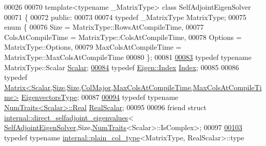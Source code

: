 \begin{DoxyCode}
00026 
00070 \textcolor{keyword}{template}<\textcolor{keyword}{typename} \_MatrixType> \textcolor{keyword}{class }SelfAdjointEigenSolver
00071 \{
00072   \textcolor{keyword}{public}:
00073 
00074     \textcolor{keyword}{typedef} \_MatrixType MatrixType;
00075     \textcolor{keyword}{enum} \{
00076       Size = MatrixType::RowsAtCompileTime,
00077       ColsAtCompileTime = MatrixType::ColsAtCompileTime,
00078       Options = MatrixType::Options,
00079       MaxColsAtCompileTime = MatrixType::MaxColsAtCompileTime
00080     \};
00081     
\hyperlink{group___eigenvalues___module_a0bfcedf4245b6846007ca4f01e4feb1f}{00083}     \textcolor{keyword}{typedef} \textcolor{keyword}{typename} MatrixType::Scalar \hyperlink{group___eigenvalues___module_a0bfcedf4245b6846007ca4f01e4feb1f}{Scalar};
\hyperlink{group___eigenvalues___module_a8a59ab7734b6eae2754fd78bc7c3a360}{00084}     \textcolor{keyword}{typedef} \hyperlink{namespace_eigen_a62e77e0933482dafde8fe197d9a2cfde}{Eigen::Index} \hyperlink{group___eigenvalues___module_a8a59ab7734b6eae2754fd78bc7c3a360}{Index}; 
00085     
00086     \textcolor{keyword}{typedef} 
      \hyperlink{group___core___module}{Matrix<Scalar,Size,Size,ColMajor,MaxColsAtCompileTime,MaxColsAtCompileTime>}
       \hyperlink{group___core___module}{EigenvectorsType};
00087 
\hyperlink{group___eigenvalues___module_a5dae5f422a3c71060e6bd31332bf64fd}{00094}     \textcolor{keyword}{typedef} \textcolor{keyword}{typename} \hyperlink{group___core___module_struct_eigen_1_1_num_traits}{NumTraits<Scalar>::Real} \hyperlink{group___eigenvalues___module_a5dae5f422a3c71060e6bd31332bf64fd}{RealScalar};
00095     
00096     \textcolor{keyword}{friend} \textcolor{keyword}{struct }\hyperlink{struct_eigen_1_1internal_1_1direct__selfadjoint__eigenvalues}{internal::direct\_selfadjoint\_eigenvalues}<
      \hyperlink{group___eigenvalues___module_class_eigen_1_1_self_adjoint_eigen_solver}{SelfAdjointEigenSolver},Size,\hyperlink{group___core___module_struct_eigen_1_1_num_traits}{NumTraits}<Scalar>::IsComplex>;
00097 
\hyperlink{group___eigenvalues___module_acd090d5fdfc3cc017a13b6d8daa92287}{00103}     typedef typename \hyperlink{struct_eigen_1_1internal_1_1plain__col__type}{internal::plain\_col\_type}<MatrixType, RealScalar>::type 

\end{DoxyCode}
